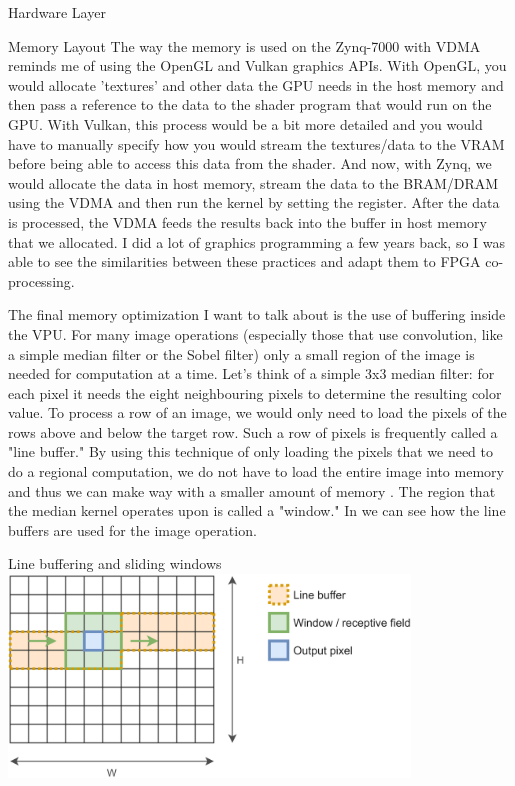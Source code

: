 \documentclass{matthijs}
\begin{document}
\begin{hoofdstuk}{Hardware Layer}
\begin{paragraaf}{Memory Layout}
			The way the memory is used on the Zynq-7000 with VDMA reminds me of using the OpenGL and Vulkan graphics APIs.
			With OpenGL, you would allocate 'textures' and other data the GPU needs in the host memory and then pass a reference to the data to the shader program that would run on the GPU.
			With Vulkan, this process would be a bit more detailed and you would have to manually specify how you would stream the textures/data to the VRAM before being able to access this data from the shader.
			And now, with Zynq, we would allocate the data in host memory, stream the data to the BRAM/DRAM using the VDMA and then run the kernel by setting the register.
			After the data is processed, the VDMA feeds the results back into the buffer in host memory that we allocated.
			I did a lot of graphics programming a few years back, so I was able to see the similarities between these practices and adapt them to FPGA co-processing.

			\bigskip

			The final memory optimization I want to talk about is the use of buffering inside the VPU.
			For many image operations (especially those that use convolution, like a simple median filter or the Sobel filter) only a small region of the image is needed for computation at a time.
			Let's think of a simple 3x3 median filter: for each pixel it needs the eight neighbouring pixels to determine the resulting color value.
			To process a row of an image, we would only need to load the pixels of the rows above and below the target row.
			Such a row of pixels is frequently called a "line buffer."
			By using this technique of only loading the pixels that we need to do a regional computation, we do not have to load the entire image into memory and thus we can make way with a smaller amount of memory \cite{hoorick2019convolution}.
			The region that the median kernel operates upon is called a "window."
			In  we can see how the line buffers are used for the image operation.
			
			\begin{figuur}{Line buffering and sliding windows}
				\includegraphics[width=0.8\textwidth]{hoorick2019-convolutions.png}
				\cite{hoorick2019convolution}
			\end{figuur}


\end{paragraaf}
\end{hoofdstuk}
\end{document}

